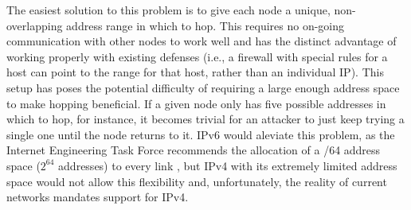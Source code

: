 

\par The easiest solution to this problem is to give each node a unique, non-overlapping address range in which to hop. This requires no on-going communication with other nodes to work well and has the distinct advantage of working properly with existing defenses (i.e., a firewall with special rules for a host can point to the range for that host, rather than an individual IP). This setup has poses the potential difficulty of requiring a large enough address space to make hopping beneficial. If a given node only has five possible addresses in which to hop, for instance, it becomes trivial for an attacker to just keep trying a single one until the node returns to it. \ac{IPv6} would aleviate this problem, as the Internet Engineering Task Force recommends the allocation of a /64 address space ($2^{64}$ addresses) to every link \cite{rfc3267}, but \ac{IPv4} with its extremely limited address space would not allow this flexibility and, unfortunately, the reality of current networks mandates support for \ac{IPv4}. 

